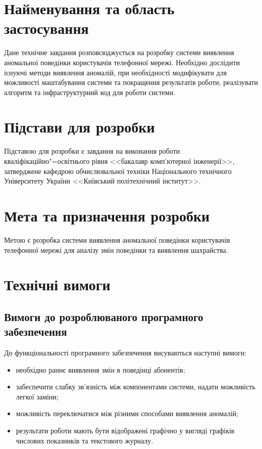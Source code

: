 \documentclass[ukrainian,utf8,pointsubsection,simple]{eskdtext}
\begin{document}
\newpage
{}
\tableofcontents
\newpage

\section{Найменування та область застосування}
Дане технічне завдання розповсюджується на розробку системи виявлення аномальної поведінки користувачів телефонної мережі. Необхідно дослідити існуючі методи виявлення аномалій, при необхідності модифікувати для можливості маштабування системи та покращення результатів роботи, реалізувати алгоритм та інфраструктурний код для роботи системи.

\section{Підстави для розробки}
Підставою для розробки є завдання на виконання роботи кваліфікаційно"=освітнього
рівня <<бакалавр комп'ютерної інженерії>>, затверджене кафедрою обчислювальної
техніки Національного технічного Університету України <<Київський політехнічний
інститут>>.

\section{Мета та призначення розробки}
Метою є розробка системи виявлення аномальної поведінки користувачів телефонної мережі для аналізу змін поведінки та виявлення шахрайства.

\section{Технічні вимоги}
\subsection{Вимоги до розроблюваного програмного забезпечення}
До функціональності програмного забезпечення висуваються наступні вимоги:

\begin{itemize}
  \item необхідно раннє виявлення змін в поведінці абонентів;
  \item забеспечити слабку зв'язність між компонентами системи, надати можливість легкої заміни;
  \item можливість переключатися між різними способами виявлення аномалій;
  \item результати роботи мають бути відображені графічно у вигляді графіків числових показників та текстового журналу.
\end{itemize}
\end{document}
